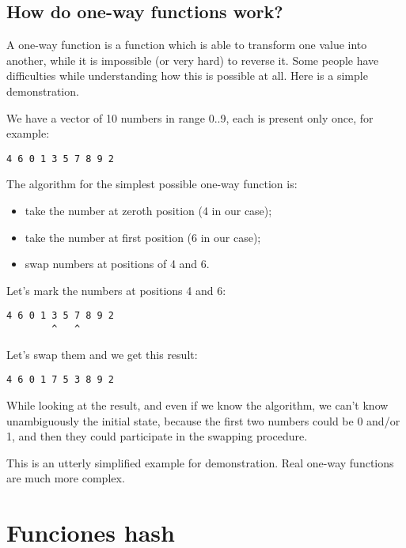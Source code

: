 \subsection{How do one-way functions work?}

A one-way function is a function which is able to transform one value into another,
while it is impossible (or very hard) to reverse it.
Some people have difficulties while understanding how this is possible at all.
Here is a simple demonstration.

We have a vector of 10 numbers in range 0..9, each is present only once, for example:

\begin{lstlisting}
4 6 0 1 3 5 7 8 9 2
\end{lstlisting}

The algorithm for the simplest possible one-way function is:

\begin{itemize}
\item take the number at zeroth position (4 in our case);
\item take the number at first position (6 in our case);
\item swap numbers at positions of 4 and 6.
\end{itemize}

Let's mark the numbers at positions 4 and 6:

\begin{lstlisting}
4 6 0 1 3 5 7 8 9 2
        ^   ^
\end{lstlisting}

Let's swap them and we get this result:

\begin{lstlisting}
4 6 0 1 7 5 3 8 9 2
\end{lstlisting}

While looking at the result, and even if we know the algorithm, we can't know unambiguously the initial
state, because the first two numbers could be 0 and/or 1, and then they could participate in the swapping procedure.

This is an utterly simplified example for demonstration. Real one-way functions are much more complex.
\fi %


\ifdefined\SPANISH
\newcommand{\HashFuncChapterName}{Funciones hash}

\section{\HashFuncChapterName}
\label{hash_func}

